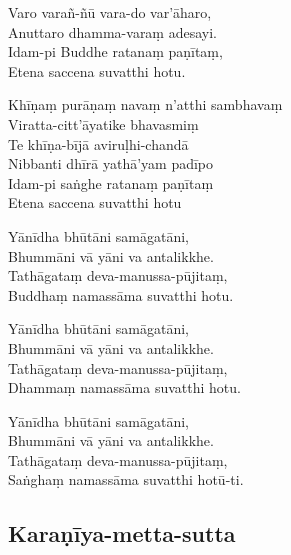 \begin{paritta}
Varo varañ-ñū vara-do var'āharo,\\
Anuttaro dhamma-varaṃ adesayi.\\
Idam-pi Buddhe ratanaṃ paṇītaṃ,\\
Etena saccena suvatthi hotu.

%
Khīṇaṃ purāṇaṃ navaṃ n'atthi sambhavaṃ\\
Viratta-citt'āyatike bhavasmiṃ\\
Te khīṇa-bījā aviruḷhi-chandā\\
Nibbanti dhīrā yathā'yam padīpo\\
Idam-pi saṅghe ratanaṃ paṇītaṃ\\
Etena saccena suvatthi hotu

Yānīdha bhūtāni samāgatāni,\\
Bhummāni vā yāni va antalikkhe.\\
Tathāgataṃ deva-manussa-pūjitaṃ,\\
Buddhaṃ namassāma suvatthi hotu.

Yānīdha bhūtāni samāgatāni,\\
Bhummāni vā yāni va antalikkhe.\\
Tathāgataṃ deva-manussa-pūjitaṃ,\\
Dhammaṃ namassāma suvatthi hotu.

Yānīdha bhūtāni samāgatāni,\\
Bhummāni vā yāni va antalikkhe.\\
Tathāgataṃ deva-manussa-pūjitaṃ,\\
Saṅghaṃ namassāma suvatthi hotū-ti. 

\end{paritta}

\subsection{Karaṇīya-metta-sutta}
\label{karaniyam-attha}



